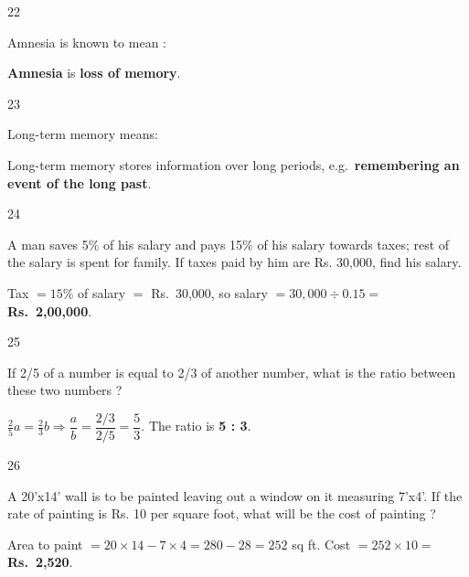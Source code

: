 \begin{question}{22}
{Amnesia is known to mean :\par}
\begin{explain}
\textbf{Amnesia} is \textbf{loss of memory}.
\end{explain}
\end{question}

\begin{question}{23}
{Long-term memory means:\par}
\begin{explain}
Long-term memory stores information over long periods, e.g.\ \textbf{remembering an event of the long past}.
\end{explain}
\end{question}

\begin{question}{24}
{A man saves 5\% of his salary and pays 15\% of his salary towards taxes; rest of the salary is spent for family. If taxes paid by him are Rs. 30,000, find his salary.\par}
\begin{explain}
Tax $=15\%$ of salary $=$ Rs.~30,000, so salary $=30{,}000\div0.15=$ \textbf{Rs.~2,00,000}.
\end{explain}
\end{question}

\begin{question}{25}
{If 2/5 of a number is equal to 2/3 of another number, what is the ratio between these two numbers ?\par}
\begin{explain}
$\tfrac25a=\tfrac23b\Rightarrow\dfrac ab=\dfrac{2/3}{2/5}=\dfrac53$. The ratio is \textbf{5 : 3}.
\end{explain}
\end{question}

\begin{question}{26}
{A 20'x14' wall is to be painted leaving out a window on it measuring 7'x4'. If the rate of painting is Rs. 10 per square foot, what will be the cost of painting ?\par}
\begin{explain}
Area to paint $=20\times14-7\times4=280-28=252$ sq ft. Cost $=252\times10=$ \textbf{Rs.~2,520}.
\end{explain}
\end{question}

